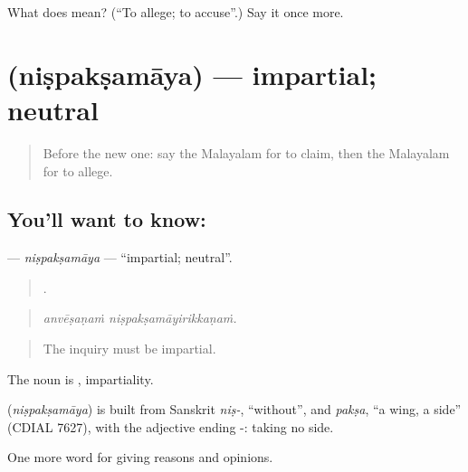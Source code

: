 \begin{tcolorbox}[breakable,colback=teal!4,colframe=teal!35!black,title={Before you move on}]
What does  mean? (\textquotedblleft{}To allege; to accuse\textquotedblright{}.) Say it once more.
\end{tcolorbox}
\section[\texorpdfstring{\ml{നിഷ്പക്ഷമായ} (niṣpakṣamāya)}{നിഷ്പക്ഷമായ (niṣpakṣamāya)}]{ (niṣpakṣamāya) — impartial; neutral}

\label{lesson:ML-C409-nispaksamaya}



\begin{quote}
Before the new one: say the Malayalam for to claim, then the Malayalam for to allege.
\end{quote}

\subsection*{You'll want to know: }
\textbf{} — \emph{niṣpakṣamāya} — \textquotedblleft{}impartial; neutral\textquotedblright{}.

\begin{quote}
 .
\end{quote}

\begin{quote}
\emph{anvēṣaṇaṁ niṣpakṣamāyirikkaṇaṁ.}
\end{quote}

\begin{quote}
The inquiry must be impartial.
\end{quote}

The noun is , impartiality.

\begin{cousinweb}
\textbf{} (\emph{niṣpakṣamāya}) is built from Sanskrit \emph{niṣ-}, \textquotedblleft{}without\textquotedblright{}, and \emph{pakṣa}, \textquotedblleft{}a wing, a side\textquotedblright{} (CDIAL 7627), with the adjective ending -: taking no side.
\end{cousinweb}

\begin{grammarlens}[title={What you've built}]
One more word for giving reasons and opinions.
\end{grammarlens}

